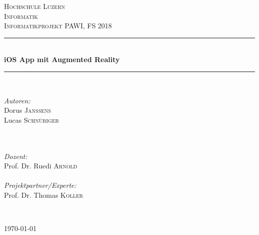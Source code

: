 \documentclass[11pt]{article} %
\begin{document}
\begin{titlepage}

\newcommand{\HRule}{\rule{\linewidth}{0.5mm}} %

\center

\textsc{\LARGE Hochschule Luzern\\Informatik}\\[1.5cm] %
\textsc{\Large Informatikprojekt PAWI, FS 2018}\\[1.5cm] %

\HRule \\[1cm]
{\huge \bfseries iOS App mit Augmented Reality}\\[0.6cm] %
\HRule \\[1cm]

\vspace{30pt}

\begin{minipage}{0.4\textwidth}
  \begin{flushleft} \large
    \emph{Autoren:}\\
    Dorus \textsc{Janssens}\\
    Lucas \textsc{Schnüriger}\\
    ~\\~ %
  \end{flushleft}
\end{minipage}
\begin{minipage}{0.4\textwidth}
  \begin{flushleft} \large
    \emph{Dozent:}\\
    Prof. Dr. Ruedi \textsc{Arnold}\\~\\
    \emph{Projektpartner/Experte:}\\
    Prof. Dr. Thomas \textsc{Koller}
  \end{flushleft}
\end{minipage}\\[1cm]


\vspace{30pt}

{\large \today }\\[1cm] %

\end{titlepage}
\end{document}

